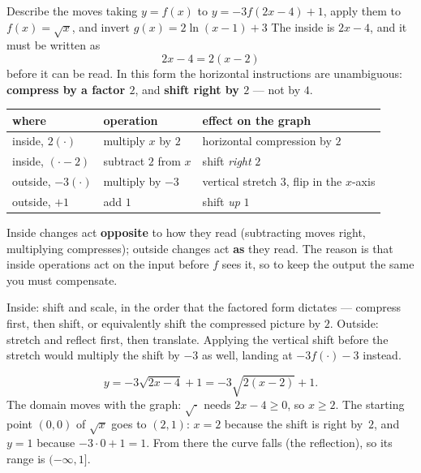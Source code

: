 \begin{worked}{Describe the moves taking $y=f(x)$ to $y=-3f(2x-4)+1$, apply them to $f(x)=\sqrt{x}$, and invert $g(x)=2\ln(x-1)+3$}
The inside is $2x-4$, and it must be written as
\[
  2x-4=2(x-2)
\]
before it can be read. In this form the horizontal instructions are
unambiguous: \textbf{compress by a factor $2$}, and \textbf{shift right by
$2$} --- not by $4$.

\begin{center}\footnotesize
\begin{tabular}{lll}
  \hline
  where & operation & effect on the graph\\
  \hline
  inside, $2(\cdot)$ & multiply $x$ by $2$ & horizontal compression by $2$ \\
  inside, $(\cdot-2)$ & subtract $2$ from $x$ & shift \emph{right} $2$ \\
  outside, $-3(\cdot)$ & multiply by $-3$ & vertical stretch $3$, flip in the $x$-axis\\
  outside, $+1$ & add $1$ & shift \emph{up} $1$ \\
  \hline
\end{tabular}
\end{center}
Inside changes act \textbf{opposite} to how they read (subtracting moves
right, multiplying compresses); outside changes act \textbf{as} they read.
The reason is that inside operations act on the input before $f$ sees it,
so to keep the output the same you must compensate.

Inside: shift and scale, in the order that the factored form dictates ---
compress first, then shift, or equivalently shift the compressed picture by
$2$. Outside: stretch and reflect first, then translate. Applying the
vertical shift before the stretch would multiply the shift by $-3$ as well,
landing at $-3f(\cdot)-3$ instead.

\[
  y=-3\sqrt{2x-4}+1=-3\sqrt{2(x-2)}+1 .
\]
The domain moves with the graph: $\sqrt{\cdot}$ needs $2x-4\ge0$, so
$x\ge2$. The starting point $(0,0)$ of $\sqrt{x}$ goes to $(2,1)$: $x=2$
because the shift is right by~$2$, and $y=1$ because $-3\cdot0+1=1$. From
there the curve falls (the reflection), so its range is $(-\infty,1]$.


\end{worked}
